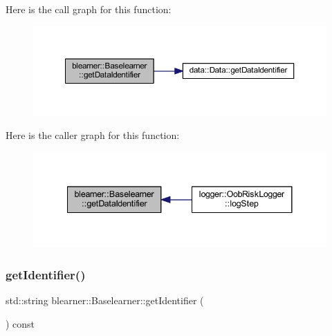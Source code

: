 Here is the call graph for this function\+:\nopagebreak
\begin{figure}[H]
\begin{center}
\leavevmode
\includegraphics[width=350pt]{classblearner_1_1_baselearner_a2393dc1e3cf90919ebbbd237fe303860_cgraph}
\end{center}
\end{figure}
Here is the caller graph for this function\+:\nopagebreak
\begin{figure}[H]
\begin{center}
\leavevmode
\includegraphics[width=341pt]{classblearner_1_1_baselearner_a2393dc1e3cf90919ebbbd237fe303860_icgraph}
\end{center}
\end{figure}
\mbox{\label{classblearner_1_1_baselearner_aa10fa4301aeb37f6e8c18457541c3be7}} 
\subsubsection{\texorpdfstring{get\+Identifier()}{getIdentifier()}}
{\footnotesize\ttfamily std\+::string blearner\+::\+Baselearner\+::get\+Identifier (\begin{DoxyParamCaption}{ }\end{DoxyParamCaption}) const}

\mbox{\label{classblearner_1_1_baselearner_a3362fe72e1b653ec3664cae2397414ed}} 
